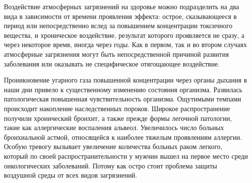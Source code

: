 Воздействие атмосферных загрязнений на здоровье можно подразделить на два вида в зависимости от времени проявления эффекта: острое, сказывающееся в период или непосредственно вслед за повышением концентрации токсичного вещества, и хроническое воздействие, результат которого проявляется не сразу, а через некоторое время, иногда через годы. Как в первом, так и во втором случаях атмосферные загрязнения могут быть непосредственной причиной развития заболевания или оказывать не специфическое отягощающее воздействие.

Проникновение угарного газа повышенной концентрации через органы дыхания в наши дни привело к существенному изменению состояния организма. Развилась патологическая повышенная чувствительность организма. Ощутимыми темпами происходит накопление наследственных пороков. Широкое распространение получили хронический бронхит, а также прежде формы легочной патологии, такие как аллергические воспаления альвеол. Увеличилось число больных бронхиальной астмой, относящейся к наиболее тяжелым проявлениям аллергии. Особую тревогу вызывает увеличение количества больных раком легкого, который по своей распространительности у мужчин вышел на первое место среди онкологических заболеваний. Потому как остро стоит проблема защиты воздушной среды от всех видов загрязнений.




